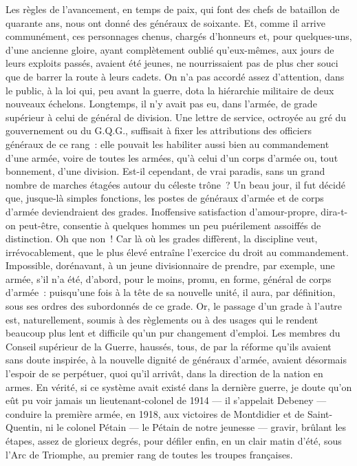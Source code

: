 \documentclass[french,twoside]{book} %
\begin{document}
Les règles de l’avancement, en temps de paix, qui font des chefs de bataillon de quarante ans, nous ont donné des généraux de soixante. Et, comme il arrive communément, ces personnages chenus, chargés d’honneurs et, pour quelques-uns, d’une ancienne gloire, ayant complètement oublié qu’eux-mêmes, aux jours de leurs exploits passés, avaient été jeunes, ne nourrissaient pas de plus cher souci que de barrer la route à leurs cadets. On n’a pas accordé assez d’attention, dans le public, à la loi qui, peu avant la guerre, dota la hiérarchie militaire de deux nouveaux échelons. Longtemps, il n’y avait pas eu, dans l’armée, de grade supérieur à celui de général de division. Une lettre de service, octroyée au gré du gouvernement ou du G.Q.G., suffisait à fixer les attributions des officiers généraux de ce rang : elle pouvait les habiliter aussi bien au commandement d’une armée, voire de toutes les armées, qu’à celui d’un corps d’armée ou, tout bonnement, d’une division. Est-il cependant, de vrai paradis, sans un grand nombre de marches étagées autour du céleste trône ? Un beau jour, il fut décidé que, jusque-là simples fonctions, les postes de généraux d’armée et de corps d’armée deviendraient des grades. Inoffensive satisfaction d’amour-propre, dira-t-on peut-être, consentie à quelques hommes un peu puérilement assoiffés de distinction. Oh que non ! Car là où les grades diffèrent, la discipline veut, irrévocablement,   que le plus élevé entraîne l’exercice du droit au commandement. Impossible, dorénavant, à un jeune divisionnaire de prendre, par exemple, une armée, s’il n’a été, d’abord, pour le moins, promu, en forme, général de corps d’armée : puisqu’une fois à la tête de sa nouvelle unité, il aura, par définition, sous ses ordres des subordonnés de ce grade. Or, le passage d’un grade à l’autre est, naturellement, soumis à des règlements ou à des usages qui le rendent beaucoup plus lent et difficile qu’un pur changement d’emploi. Les membres du Conseil supérieur de la Guerre, haussés, tous, de par la réforme qu’ils avaient sans doute inspirée, à la nouvelle dignité de généraux d’armée, avaient désormais l’espoir de se perpétuer, quoi qu’il arrivât, dans la direction de la nation en armes. En vérité, si ce système avait existé dans la dernière guerre, je doute qu’on eût pu voir jamais un lieutenant-colonel de 1914 — il s’appelait Debeney — conduire la première armée, en 1918, aux victoires de Montdidier et de Saint-Quentin, ni le colonel Pétain — le Pétain de notre jeunesse — gravir, brûlant les étapes, assez de glorieux degrés, pour défiler enfin, en un clair matin d’été, sous l’Arc de Triomphe, au premier rang de toutes les troupes françaises.\par
\end{document}
